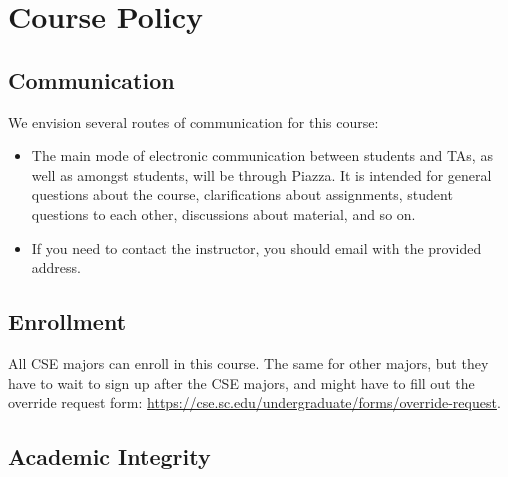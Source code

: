 \documentclass[11pt]{article}
\begin{document}
\section*{Course Policy}

\subsection*{Communication}
We envision several routes of communication for this course:

\begin{itemize}
\item The main mode of electronic communication between students and TAs, as well as amongst students, will be through Piazza. It is intended for general questions about the course, clarifications about assignments, student questions to each other, discussions about material, and so on. 

\item If you need to contact the instructor, you should email with the provided address. 
\end{itemize}


\subsection*{Enrollment}

All CSE majors can enroll in this course. The same for other majors, but they have to wait to sign up after the CSE majors, and might have to fill out the override request form: \url{https://cse.sc.edu/undergraduate/forms/override-request}.

\subsection*{Academic Integrity}
\end{document}
